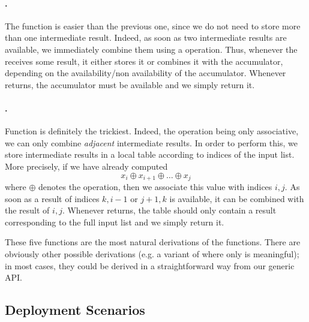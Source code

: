 \documentclass[tfpsymp,pagenumbers]{tfp07symp}
\begin{document}
\paragraph{.}
The function  is easier than the previous one, since
we do not need to store more than one intermediate result. Indeed, as
soon as two intermediate results are available, we immediately combine
them using a  operation. Thus, whenever the 
receives some result, it either stores it or combines it with the
accumulator, depending on the availability/non availability of the
accumulator.  Whenever  returns, the accumulator must be
available and we simply return it.

\paragraph{.}
Function  is definitely the trickiest. Indeed, the
operation being only associative, we can only combine \emph{adjacent}
intermediate results. In order to perform this, we store intermediate
results in a local table according to indices of the input list. More
precisely, if we have already computed
\begin{displaymath}
  x_i \oplus x_{i+1} \oplus \dots \oplus x_j
\end{displaymath}
where $\oplus$ denotes the  operation, then we associate this
value with indices $i,j$. As soon as a result of indices $k,i-1$ or
$j+1,k$ is available, it can be combined with the result of $i,j$.
Whenever  returns, the table should only contain a result
corresponding to the full input list and we simply return it.

\medskip
These five functions are the most natural derivations of the
 functions. There are obviously other possible derivations
(e.g. a variant of  where only  is meaningful);
in most cases, they could be derived in a straightforward way from our
generic API.

\subsection{Deployment Scenarios}
\end{document}
